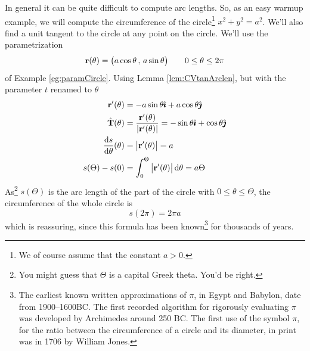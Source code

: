 \begin{eg}\label{eg:paramCircleTan}
In general it can be quite difficult to compute arc lengths.
So, as an easy warmup example, we will compute the circumference of the 
circle\footnote{We of course assume that the constant $a>0$.}
$x^2+y^2=a^2$. We'll also find a unit tangent to the circle at any point on
the circle. We'll use the parametrization
\begin{equation*}
\mathbf{r}(\theta) = \big(a\cos\theta\,,\,a\sin\theta\big)\qquad
0\le \theta\le 2\pi
\end{equation*}
of Example \ref{eg:paramCircle}. Using Lemma \ref{lem:CVtanArclen},
but with the parameter $t$ renamed to $\theta$
\begin{align*}
\vr'(\theta) &= -a\sin\theta\hi + a\cos\theta\hj \\
\hat\vT(\theta) &= \frac{\vr'(\theta)}{|\vr'(\theta)|}
               =  -\sin\theta\hi + \cos\theta\hj \\
\diff{s}{\theta}(\theta)&=\big|\vr'(\theta)\big| = a\\
s(\Theta)-s(0)&= \int_{0}^\Theta \big|\vr'(\theta)\big|\,\dee{\theta}
          =a\Theta
\end{align*}
As\footnote{You might guess that $\Theta$ is a capital Greek theta. You'd be right.} $s(\Theta)$ is the arc length of the part of the circle with 
$0\le\theta\le\Theta$, the circumference of the whole circle is
\begin{equation*}
s(2\pi) = 2\pi a
\end{equation*} 
which is reassuring, since this formula has been known\footnote{The earliest known written approximations of $\pi$, in Egypt and Babylon, date 
from 1900--1600BC. The first recorded algorithm for rigorously evaluating $\pi$
was developed by Archimedes around 250 BC. The first use of the symbol $\pi$,
for the ratio between the circumference of a circle and its diameter,
in print was in 1706 by William Jones.}
for thousands of years.%
\end{eg}
